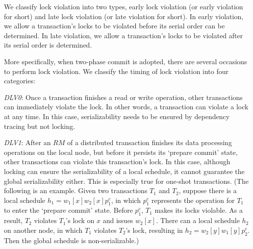 \documentclass[conference]{IEEEtran}
\begin{document}
We classify lock violation into two types, early lock violation (or early violation for short) and late lock violation (or late violation for short).
In early violation,  we allow a transaction's locks to be violated before its serial order can be determined.
In late violation,  we allow a transaction's locks to be violated after its serial order is determined.


More specifically, when two-phase commit is adopted, there are several occasions to perform lock violation.
We classify the timing of lock violation into four categories:

\emph{DLV0}:
Once a transaction finishes a read or write operation, other transactions can immediately violate the lock.
In other words, a transaction can violate a lock at any time.
In this case, serializability needs to be ensured by dependency tracing but not locking.

\emph{DLV1}:
After an ${RM}$ of a distributed transaction finishes its data processing operations on the local node, but before it persists its `prepare commit' state, other transactions can violate this transaction's lock.
In this case, although locking can ensure the serializability of a local schedule, it cannot guarantee the global serializability either.
This is especially true for one-shot transactions.
(The following is an example. Given two transactions $T_1$ and $T_2$, suppose there is a local schedule ${h_1=w_1[x]w_2[x]p_1^c}$, in which ${p_1^c}$ represents the operation for ${T_1}$ to enter the `prepare commit' state.
Before ${p_1^c}$, ${T_1}$ makes its locks violable. As a result, ${T_2}$ violates ${T_1}$'s lock on ${x}$ and issues ${w_2[x]}$.
There can a local schedule ${h_2}$ on another node, in which ${T_1}$ violates ${T_2}$'s lock, resulting in ${h_2=w_2[y]w_1[y]p_2^c}$.
Then the global schedule is non-serializable.)
\end{document}
